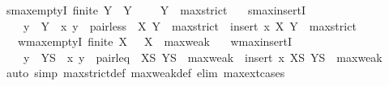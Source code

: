 \begin{isabellebody}
\begin{isamarkuptext}
\end{isamarkuptext}\isamarkuptrue%
\isamarkupfalse%
\ smax{\isacharunderscore}{\kern0pt}emptyI{\isacharcolon}{\kern0pt}\ {\isachardoublequoteopen}finite\ Y\ {\isasymLongrightarrow}\ Y\ {\isasymnoteq}\ {\isacharbraceleft}{\kern0pt}{\isacharbraceright}{\kern0pt}\ {\isasymLongrightarrow}\ {\isacharparenleft}{\kern0pt}{\isacharbraceleft}{\kern0pt}{\isacharbraceright}{\kern0pt}{\isacharcomma}{\kern0pt}\ Y{\isacharparenright}{\kern0pt}\ {\isasymin}\ max{\isacharunderscore}{\kern0pt}strict{\isachardoublequoteclose}\isanewline
\ \ \ smax{\isacharunderscore}{\kern0pt}insertI{\isacharcolon}{\kern0pt}\isanewline
\ \ \ \ {\isachardoublequoteopen}y\ {\isasymin}\ Y\ {\isasymLongrightarrow}\ {\isacharparenleft}{\kern0pt}x{\isacharcomma}{\kern0pt}\ y{\isacharparenright}{\kern0pt}\ {\isasymin}\ pair{\isacharunderscore}{\kern0pt}less\ {\isasymLongrightarrow}\ {\isacharparenleft}{\kern0pt}X{\isacharcomma}{\kern0pt}\ Y{\isacharparenright}{\kern0pt}\ {\isasymin}\ max{\isacharunderscore}{\kern0pt}strict\ {\isasymLongrightarrow}\ {\isacharparenleft}{\kern0pt}insert\ x\ X{\isacharcomma}{\kern0pt}\ Y{\isacharparenright}{\kern0pt}\ {\isasymin}\ max{\isacharunderscore}{\kern0pt}strict{\isachardoublequoteclose}\isanewline
\ \ \ wmax{\isacharunderscore}{\kern0pt}emptyI{\isacharcolon}{\kern0pt}\ {\isachardoublequoteopen}finite\ X\ {\isasymLongrightarrow}\ {\isacharparenleft}{\kern0pt}{\isacharbraceleft}{\kern0pt}{\isacharbraceright}{\kern0pt}{\isacharcomma}{\kern0pt}\ X{\isacharparenright}{\kern0pt}\ {\isasymin}\ max{\isacharunderscore}{\kern0pt}weak{\isachardoublequoteclose}\isanewline
\ \ \ wmax{\isacharunderscore}{\kern0pt}insertI{\isacharcolon}{\kern0pt}\isanewline
\ \ \ \ {\isachardoublequoteopen}y\ {\isasymin}\ YS\ {\isasymLongrightarrow}\ {\isacharparenleft}{\kern0pt}x{\isacharcomma}{\kern0pt}\ y{\isacharparenright}{\kern0pt}\ {\isasymin}\ pair{\isacharunderscore}{\kern0pt}leq\ {\isasymLongrightarrow}\ {\isacharparenleft}{\kern0pt}XS{\isacharcomma}{\kern0pt}\ YS{\isacharparenright}{\kern0pt}\ {\isasymin}\ max{\isacharunderscore}{\kern0pt}weak\ {\isasymLongrightarrow}\ {\isacharparenleft}{\kern0pt}insert\ x\ XS{\isacharcomma}{\kern0pt}\ YS{\isacharparenright}{\kern0pt}\ {\isasymin}\ max{\isacharunderscore}{\kern0pt}weak{\isachardoublequoteclose}\isanewline
%
\isadelimproof
\ \ %
\endisadelimproof
%
\isatagproof
{}\isamarkupfalse%
\ {\isacharparenleft}{\kern0pt}auto\ simp{\isacharcolon}{\kern0pt}\ max{\isacharunderscore}{\kern0pt}strict{\isacharunderscore}{\kern0pt}def\ max{\isacharunderscore}{\kern0pt}weak{\isacharunderscore}{\kern0pt}def\ elim{\isacharbang}{\kern0pt}{\isacharcolon}{\kern0pt}\ max{\isacharunderscore}{\kern0pt}ext{\isachardot}{\kern0pt}cases{\isacharparenright}{\kern0pt}%

\end{isabellebody}
